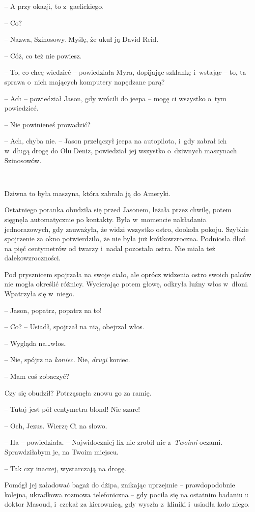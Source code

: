\documentclass[oneside,polish,11pt,sfheadings]{mwbk}
\begin{document}
-- A przy okazji, to z~gaelickiego.

-- Co?

-- Nazwa, Szinosowy. Myślę, że ukuł ją David Reid.

-- Cóż, co też nie powiesz.

-- To, co chcę wiedzieć -- powiedziała Myra, dopijając szklankę i~wstając
-- to, ta sprawa o~nich mających komputery napędzane parą?

-- Ach -- powiedział Jason, gdy wrócili do jeepa -- mogę ci wszystko o~tym
powiedzieć.

-- Nie powinieneś prowadzić?

-- Ach, chyba nie. -- Jason przełączył jeepa na autopilota, i~gdy zabrał
ich w~długą drogę do Olu Deniz, powiedział jej wszystko o~dziwnych
maszynach Szinosowów.

~

Dziwna to była maszyna, która zabrała ją do Ameryki.

Ostatniego poranka obudziła się przed Jasonem, leżała przez chwilę,
potem sięgnęła automatycznie po kontakty. Była w~momencie nakładania
jednorazowych, gdy zauważyła, że widzi wszystko ostro, dookoła pokoju.
Szybkie spojrzenie za okno potwierdziło, że nie była już krótkowzroczna.
Podniosła dłoń na pięć centymetrów od twarzy i~nadal pozostała ostra.
Nie miała też dalekowzroczności.

Pod prysznicem spojrzała na swoje ciało, ale oprócz widzenia ostro
swoich palców nie mogła określić różnicy. Wycierając potem głowę,
odkryła luźny włos w~dłoni. Wpatrzyła się w~niego.

-- Jason, popatrz, popatrz na to!

-- Co? -- Usiadł, spojrzał na nią, obejrzał włos.

-- Wygląda na\ldots włos.

-- Nie, spójrz na \textit{koniec}. Nie, \textit{drugi} koniec.

-- Mam coś zobaczyć?

Czy się obudził? Potrząsnęła znowu go za ramię.

-- Tutaj jest pół centymetra blond! Nie szare!

-- Och, Jezus. Wierzę Ci na słowo.

-- Ha -- powiedziała. -- Najwidoczniej fix nie zrobił nic z~\textit{Twoimi}
oczami. Sprawdziłabym je, na Twoim miejscu.

-- Tak czy inaczej, wystarczają na drogę.

Pomógł jej załadować bagaż do dżipa, znikając uprzejmie -- prawdopodobnie
kolejna, ukradkowa rozmowa telefoniczna -- gdy pociła się na ostatnim
badaniu u doktor Masoud, i~czekał za kierownicą, gdy wyszła z~kliniki i~usiadła koło niego.
\end{document}
